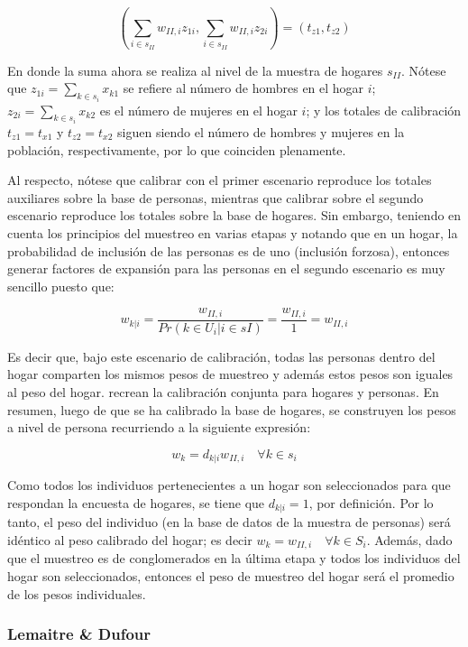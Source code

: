 \documentclass[
  12pt,
  spanish,
]{book}
\begin{document}
\[
\left ( \sum_{i \in s_{II}} w_{II,i} z_{1i}, \sum_{i \in s_{II}} w_{II,i} z_{2i}\right )=(t_{z1}, t_{z2})
\]

En donde la suma ahora se realiza al nivel de la muestra de hogares \(s_{II}\). Nótese que \(z_{1i}=\sum_{k \in s_i} x_{k1}\) se refiere al número de hombres en el hogar \(i\); \(z_{2i}=\sum_{k \in s_i} x_{k2}\) es el número de mujeres en el hogar \(i\); y los totales de calibración \(t_{z1} = t_{x1}\) y \(t_{z2} = t_{x2}\) siguen siendo el número de hombres y mujeres en la población, respectivamente, por lo que coinciden plenamente.

Al respecto, nótese que calibrar con el primer escenario reproduce los totales auxiliares sobre la base de personas, mientras que calibrar sobre el segundo escenario reproduce los totales sobre la base de hogares. Sin embargo, teniendo en cuenta los principios del muestreo en varias etapas y notando que en un hogar, la probabilidad de inclusión de las personas es de uno (inclusión forzosa), entonces generar factores de expansión para las personas en el segundo escenario es muy sencillo puesto que:

\[
w_{k|i}= \frac{w_{II,i}}{Pr(k \in U_i | i \in sI)} = \frac{w_{II,i}}{1} = w_{II,i}
\]

Es decir que, bajo este escenario de calibración, todas las personas dentro del hogar comparten los mismos pesos de muestreo y además estos pesos son iguales al peso del hogar. \citet[sec.~5]{Estevao_Sarndal_2006} recrean la calibración conjunta para hogares y personas. En resumen, luego de que se ha calibrado la base de hogares, se construyen los pesos a nivel de persona recurriendo a la siguiente expresión:

\[
w_k = d_{k|i}w_{II,i} \quad \forall k \in s_i
\]

Como todos los individuos pertenecientes a un hogar son seleccionados para que respondan la encuesta de hogares, se tiene que \(d_{k|i} = 1\), por definición. Por lo tanto, el peso del individuo (en la base de datos de la muestra de personas) será idéntico al peso calibrado del hogar; es decir \(w_k = w_{II,i} \quad \forall k \in S_i\). Además, dado que el muestreo es de conglomerados en la última etapa y todos los individuos del hogar son seleccionados, entonces el peso de muestreo del hogar será el promedio de los pesos individuales.

\hypertarget{lemaitre-dufour}{%
\subsubsection*{Lemaitre \& Dufour}\label{lemaitre-dufour}}
\end{document}
